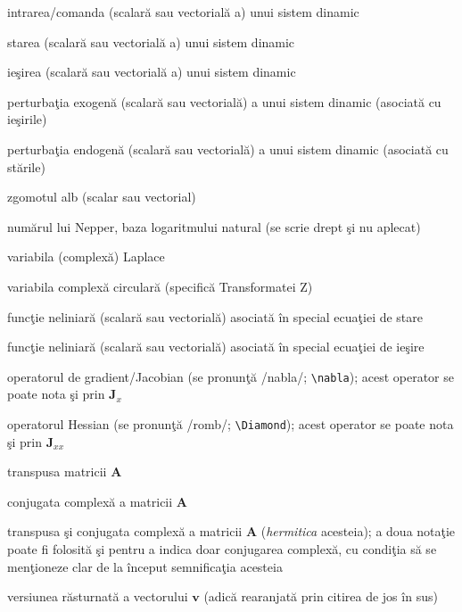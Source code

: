 \begin{description}[style=nextline]
\begin{description}[before={\renewcommand\makelabel[1]{##1 =}},leftmargin=!,labelwidth=\widthof{\bfseries blaaaaaaaa}]
\item[$u$, $\mathbf u$] intrarea/comanda (scalară sau vectorială a) unui sistem dinamic
\item[$x$, $\mathbf x$] starea (scalară sau vectorială a) unui sistem dinamic
\item[$y$, $\mathbf y$] ieşirea (scalară sau vectorială a) unui sistem dinamic
\item[$v$, $\mathbf v$] perturba\c tia exogenă (scalară sau vectorială) a unui sistem dinamic (asociată cu ieşirile)
\item[$w$, $\mathbf w$] perturba\c tia endogenă (scalară sau vectorială) a unui sistem dinamic (asociată cu stările)
\item[$e$, $\mathbf e$] zgomotul alb (scalar sau vectorial)
\item[$\mathrm{e}$] numărul lui Nepper, baza logaritmului natural (se scrie drept şi nu aplecat)
\item[$s$] variabila (complexă) Laplace
\item[$z$] variabila complexă circulară (specifică Transformatei Z)
\item[$f$, $\mathbf f$] func\c tie neliniară (scalară sau vectorială) asociată în special ecua\c tiei de stare
\item[$g$, $\mathbf g$] func\c tie neliniară (scalară sau vectorială) asociată în special ecua\c tiei de ieşire
\item[$\nabla$, $\nabla_x$] operatorul  de  gradient/Jacobian  (se  pronun\c tă  /nabla/;  \verb+\nabla+);  acest operator se poate nota şi prin $\mathbf J_x$
\item[$\Diamond$, $\Diamond_x$] operatorul  Hessian (se  pronun\c tă  /romb/;  \verb+\Diamond+);  acest operator se poate nota şi prin $\mathbf J_{xx}$
\item[$\mathbf A^T$] transpusa matricii $\mathbf A$
\item[$\bar{\mathbf A}$] conjugata complex\u a a matricii $\mathbf A$
\item[$\bar{\mathbf A}^T$, $A^*$] transpusa  şi  conjugata  complexă  a  matricii $\mathbf A$   (\emph{hermitica}  acesteia);  a  doua nota\c tie poate fi folosită şi pentru a indica doar conjugarea complexă, cu condi\c tia să se men\c tioneze clar de la început semnifica\c tia acesteia
\item[$\mathbf v^R$]  versiunea răsturnată a vectorului  $\mathbf v$  (adică rearanjată prin citirea de jos în sus)
\end{description}
\end{description}